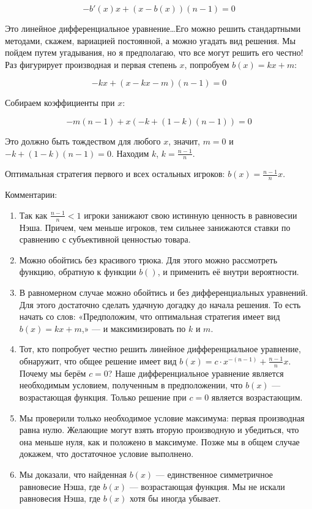 \begin{enumerate}
\begin{equation}
-b'(x)x+(x-b(x))(n-1)=0
\end{equation}

Это линейное дифференциальное уравнение\ldots Его можно решить стандартными методами, скажем, вариацией постоянной, а можно угадать вид решения. Мы пойдем путем угадывания, но я предполагаю, что все могут решить его честно! Раз фигурирует производная и первая степень $ x $, попробуем $b(x)=kx+m $:

\begin{equation}
-kx+(x-kx-m)(n-1)=0
\end{equation}

Собираем коэффициенты при $ x $:

\begin{equation}
-m(n-1)+x(-k+(1-k)(n-1))=0
\end{equation}

Это должно быть тождеством для любого $ x $, значит, $ m=0 $ и  $-k+(1-k)(n-1)=0$. Находим $ k $, $ k=\frac{n-1}{n} $.

Оптимальная стратегия первого и всех остальных игроков: $ b(x)=\frac{n-1}{n}x $.


Комментарии:

\begin{enumerate}
\item Так как $ \frac{n-1}{n}<1 $ игроки занижают свою истинную ценность в равновесии Нэша. Причем, чем меньше игроков, тем сильнее занижаются ставки по сравнению с субъективной ценностью товара.
\item Можно обойтись без красивого трюка. Для этого можно рассмотреть функцию, обратную к функции $b()$, и применить её внутри вероятности.
\item В равномерном случае можно обойтись и без дифференциальных уравнений. Для этого достаточно сделать удачную догадку до начала решения. То есть начать со слов: «Предположим, что оптимальная стратегия имеет вид $ b(x)=kx+m $,» — и максимизировать по $k$ и $m$.
\item Тот, кто попробует честно решить линейное дифференциальное уравнение, обнаружит, что общее решение имеет вид $ b(x)=c\cdot x^{-(n-1)}+\frac{n-1}{n}x $. Почему мы берём $ c=0 $? Наше дифференциальное уравнение является необходимым условием, полученным в предположении, что $ b(x) $ — возрастающая функция. Только решение при $ c=0 $ является возрастающим.
\item Мы проверили только необходимое условие максимума: первая производная равна нулю. Желающие могут взять вторую производную и убедиться, что она меньше нуля, как и положено в максимуме. Позже мы в общем случае докажем, что достаточное условие выполнено.
\item Мы доказали, что найденная $ b(x) $ — единственное симметричное равновесие Нэша, где $ b(x) $ — возрастающая функция. Мы не искали равновесия Нэша, где $ b(x) $ хотя бы иногда убывает.
\end{enumerate}



\end{enumerate}
